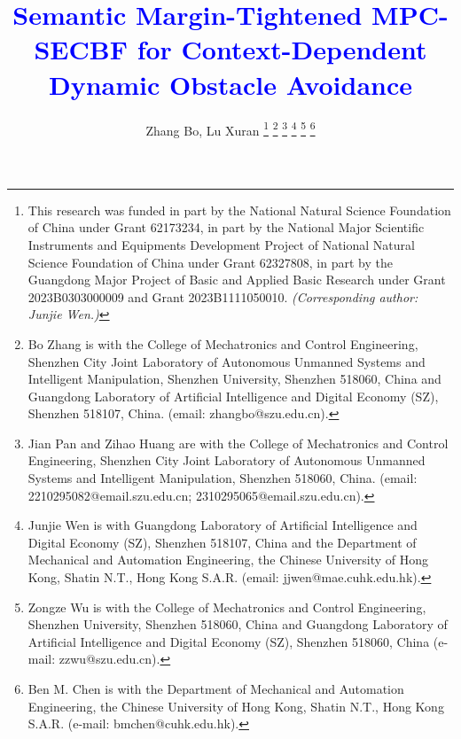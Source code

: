 \documentclass[journal]{IEEEtranTIE}
\begin{document}
\title{\textcolor{blue}{Semantic Margin-Tightened MPC-SECBF for Context-Dependent Dynamic Obstacle Avoidance}}

    \author{Zhang Bo, Lu Xuran
    \thanks{This research was funded in part by the National Natural Science
    Foundation of China under Grant 62173234, in part by the National Major Scientific
    Instruments and Equipments Development Project of National Natural Science Foundation
    of China under Grant 62327808, in part by the Guangdong Major Project of
    Basic and Applied Basic Research under Grant 2023B0303000009 and Grant
    2023B1111050010. \textit{(Corresponding author: Junjie Wen.)}}
    \thanks{Bo Zhang is with the College of Mechatronics and Control Engineering,
    Shenzhen City Joint Laboratory of Autonomous Unmanned Systems and Intelligent
    Manipulation, Shenzhen University, Shenzhen 518060, China and Guangdong
    Laboratory of Artificial Intelligence and Digital Economy (SZ), Shenzhen 518107,
    China. (email: zhangbo@szu.edu.cn).}
    \thanks{Jian Pan and Zihao Huang are with the College of Mechatronics and
    Control Engineering, Shenzhen City Joint Laboratory of Autonomous Unmanned Systems
    and Intelligent Manipulation, Shenzhen 518060, China. (email:
    2210295082@email.szu.edu.cn; 2310295065@email.szu.edu.cn).}
    \thanks{Junjie Wen is with Guangdong Laboratory of Artificial Intelligence
    and Digital Economy (SZ), Shenzhen 518107, China and the Department of
    Mechanical and Automation Engineering, the Chinese University of Hong Kong,
    Shatin N.T., Hong Kong S.A.R. (email: jjwen@mae.cuhk.edu.hk).}
    \thanks{Zongze Wu is with the College of Mechatronics and Control
    Engineering, Shenzhen University, Shenzhen 518060, China and Guangdong Laboratory
    of Artificial Intelligence and Digital Economy (SZ), Shenzhen 518060, China (e-mail:
    zzwu@szu.edu.cn).}
    \thanks{Ben M. Chen is with the Department of Mechanical and Automation Engineering,
    the Chinese University of Hong Kong, Shatin N.T., Hong Kong S.A.R. (e-mail:
    bmchen@cuhk.edu.hk).}
    }
    \maketitle
\end{document}
